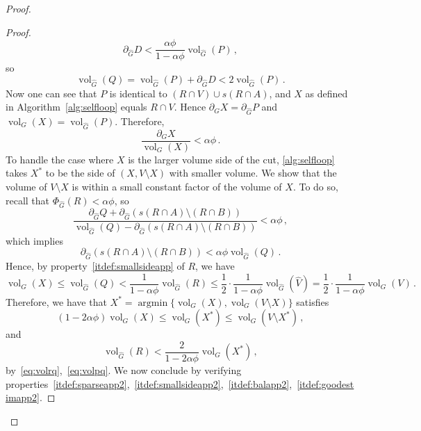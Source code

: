\documentclass[epsfig,letter,11pt]{article}
\numberwithin{equation}{section}
\DeclareMathOperator{\vol}{vol}
\renewcommand{\hat}{\widehat}
\DeclareMathOperator*{\argmin}{argmin}
\begin{document}
\begin{proof}
\begin{proof}
\begin{equation*}
		\partial_{\hat{G}} D < \frac{\alpha \phi}{1-\alpha\phi}\vol_{\hat{G}}(P) \, ,
	\end{equation*}
	so
	\begin{equation}
		\label{eq:volpq}
		\vol_{\hat{G}}(Q) = \vol_{\hat{G}}(P) + \partial_{\hat{G}} D < 2 \vol_{\hat{G}}(P) \, .
	\end{equation}
	Now one can see that $P$ is identical to $(R \cap V) \cup s(R \cap A)$, and $X$ as defined in Algorithm~\ref{alg:selfloop} equals $R \cap V$. Hence $\partial_G X = \partial_{\hat{G}} P$ and $\vol_G(X)=\vol_{\hat{G}}(P)$. Therefore,
	\begin{equation}
		\label{eq:smallratio}
		\frac{\partial_G X}{\vol_G (X)} < \alpha \phi \, .
	\end{equation}
	To handle the case where $X$ is the larger volume side of the cut, \cref{alg:selfloop} takes $X^*$ to be the side of $(X,V\setminus X)$ with smaller volume. We show that the volume of $V\setminus X$ is within a small constant factor of the volume of $X$. To do so, recall that $\Phi_{\hat{G}}(R)<\alpha \phi$, so
	\begin{equation*}
		\frac{\partial_{\hat{G}} Q + \partial_{\hat{G}}(s(R \cap A) \setminus (R \cap B))}{\vol_{\hat{G}}(Q) - \partial_{\hat{G}}(s(R \cap A) \setminus (R \cap B))} < \alpha \phi \,,
	\end{equation*}
	which implies
	\begin{equation*}
		\partial_{\hat{G}}(s(R \cap A) \setminus (R \cap B)) < \alpha \phi \vol_{\hat{G}}(Q) \, .
	\end{equation*}
	Hence, by property~\eqref{itdef:smallsideapp} of $R$, we have
	\begin{equation*}
		\vol_G(X) \le \vol_{\hat{G}}(Q) < \frac{1}{1-\alpha\phi}\vol_{\hat{G}}(R) \le \frac{1}{2} \cdot  \frac{1}{1-\alpha\phi} \vol_{\hat{G}}(\hat{V}) = \frac{1}{2} \cdot  \frac{1}{1-\alpha\phi}\vol_G(V) \, .
	\end{equation*}
	Therefore, we have that $X^* = \argmin\{\vol_G(X), \vol_G(V\setminus X)\}$ satisfies
	\begin{equation}
			\label{eq:nearlysamevol}
		(1-2\alpha\phi)\vol_G(X) \le \vol_G(X^*) \le \vol_G(V\setminus X^*) \, ,
	\end{equation}
	and
	\begin{equation}
		\label{eq:largevol}
		\vol_{\hat{G}}(R) < \frac{2}{1-2\alpha \phi}\vol_G(X^*) \, ,
	\end{equation}
by~\eqref{eq:volrq},~\eqref{eq:volpq}. We now conclude by verifying properties~\eqref{itdef:sparseapp2},~\eqref{itdef:smallsideapp2},~\eqref{itdef:balapp2},~\eqref{itdef:goodestimapp2}.


\end{proof}
\end{proof}
\end{document}
